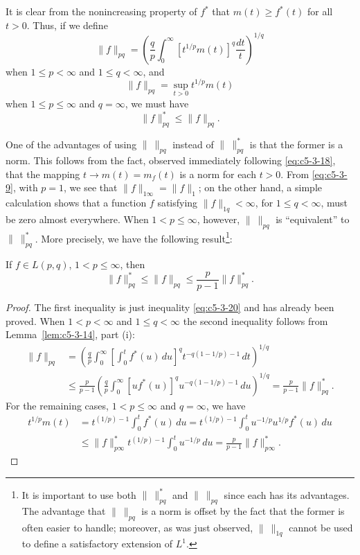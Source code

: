 It is clear from the nonincreasing property of $f^{*}$ that
$m(t) \geq f^{*}(t)$ for all $t > 0$. Thus, if we define
\[
\|f\|_{pq}=\left(\frac{q}{p}\int_{0}^{\infty}[t^{1/p}m(t)]^{q}\frac{dt}{t}\right)^{1/q}
\]
when $1 \leq p < \infty$ and $1 \leq q < \infty$, and
\[
\|f\|_{pq}=\sup_{t>0}t^{1/p}m(t)
\]
when $1 \leq p \leq \infty$ and $q = \infty$, we must have
\begin{equation}\label{eq:c5-3-20}
\|f\|_{pq}^{*}\leq\|f\|_{pq}.
\end{equation}

One of the advantages of using $\|\ \|_{pq}$ instead of $\|\ \|_{pq}^{*}$ is
that the former is a norm. This follows from the fact, observed immediately
following \eqref{eq:c5-3-18}, that the mapping $t \to m(t) = m_{f}(t)$ is a
norm for each $t > 0$. From \eqref{eq:c5-3-9}, with $p = 1$, we see that
$\|f\|_{1\infty} = \|f\|_{1}$; on the other hand, a simple calculation shows
that a function $f$ satisfying $\|f\|_{1q} < \infty$, for $1 \leq q < \infty$,
must be zero almost everywhere. When $1 < p \leq \infty$, however,
$\|\ \|_{pq}$ is ``equivalent'' to $\|\ \|_{pq}^{*}$. More precisely, we have
the following result\footnote{It is important to use both $\|\ \|_{pq}^{*}$
and $\|\ \|_{pq}$ since each has its advantages. The advantage that
$\|\ \|_{pq}$ is a norm is offset by the fact that the former is often easier
to handle; moreover, as was just observed, $\|\ \|_{1q}$ cannot be used to
define a satisfactory extension of $L^{1}$.}:

\begin{theorem}\label{thm:c5-3-21}
If $f \in L(p, q)$, $1 < p \leq \infty$, then
\[
\|f\|_{pq}^{*}\leq\|f\|_{pq}\leq\frac{p}{p-1}\|f\|_{pq}^{*}.
\]
\end{theorem}

\begin{proof}
The first inequality is just inequality \eqref{eq:c5-3-20} and has already
been proved. When $1 < p < \infty$ and $1 \leq q < \infty$ the second
inequality follows from Lemma~\ref{lem:c5-3-14}, part (i):
\begin{align*}
\|f\|_{pq}&=\left(\frac{q}{p}\int_{0}^{\infty}\left[\int_{0}^{t}f^{*}(u)\,du\right]^{q}
t^{-q(1-1/p)-1}\,dt\right)^{1/q}\\
&\leq\frac{p}{p-1}\left(\frac{q}{p}\int_{0}^{\infty}[uf^{*}(u)]^{q}
u^{-q(1-1/p)-1}\,du\right)^{1/q}
=\frac{p}{p-1}\|f\|_{pq}^{*}.
\end{align*}
For the remaining cases, $1 < p \leq \infty$ and $q = \infty$, we have
\begin{align*}
t^{1/p}m(t)&=t^{(1/p)-1}\int_{0}^{t}f^{*}(u)\,du
=t^{(1/p)-1}\int_{0}^{t}u^{-1/p}u^{1/p}f^{*}(u)\,du\\
&\leq\|f\|_{p\infty}^{*}t^{(1/p)-1}\int_{0}^{t}u^{-1/p}\,du
=\frac{p}{p-1}\|f\|_{p\infty}^{*}.
\end{align*}
\end{proof}


